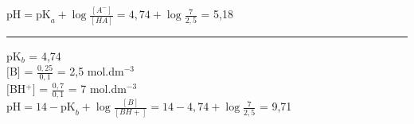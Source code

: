 $\textrm{pH} = \textrm{pK}_a + \log \frac{[A^-]}{[HA]} = 4,74 + \log \frac{7}{2,5}$ = 5,18\\


\hrule


pK$_b$ = 4,74\\
$[$B$]$ = $\frac{0,25}{0,1}$ = 2,5 mol.dm$^{-3}$\\
$[$BH$^+]$ = $\frac{0,7}{0,1}$ = 7 mol.dm$^{-3}$\\

$\textrm{pH} = 14 - \textrm{pK}_b + \log \frac{[B]}{[BH+]} = 14 - 4,74 + \log \frac{7}{2,5}$ = 9,71\\


\clearpage